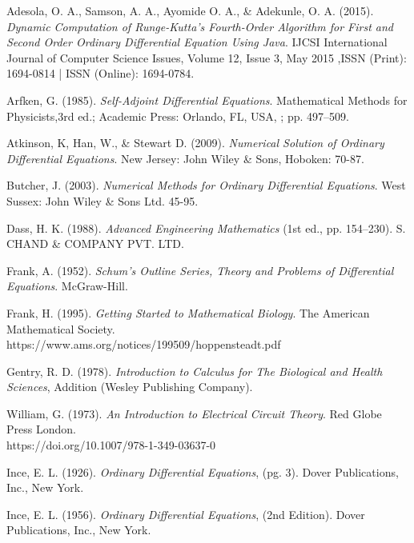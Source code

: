 \documentclass[11pt]{report}
\begin{document}
	\begin{description}
		\item Adesola, O. A., Samson, A. A., Ayomide O. A., \& Adekunle, O. A. (2015). \emph{Dynamic Computation of Runge-Kutta’s Fourth-Order Algorithm for
		First and Second Order Ordinary Differential Equation Using Java}. IJCSI International Journal of Computer Science Issues, Volume 12, Issue 3, May 2015 ,ISSN (Print): 1694-0814 | ISSN (Online): 1694-0784.
		
		\item Arfken, G. (1985). \emph{Self-Adjoint Differential Equations}. Mathematical Methods for Physicists,3rd ed.; Academic Press: Orlando, FL, USA, ; pp. 497–509.
		
		\item Atkinson, K, Han, W., \& Stewart D. (2009). \emph{Numerical Solution of Ordinary Differential Equations}. New Jersey: John Wiley \& Sons, Hoboken: 70-87.
		
		\item Butcher, J. (2003). \emph{Numerical Methods for Ordinary Differential Equations}. West Sussex:
		John Wiley \& Sons Ltd. 45-95.
		
		\item Dass, H. K. (1988). \emph{Advanced Engineering Mathematics} (1st ed., pp. 154–230). S. CHAND \& COMPANY PVT. LTD.
		
		\item Frank, A. (1952). \emph{Schum's Outline Series, Theory and Problems of Differential Equations}. McGraw-Hill.
		
		\item Frank, H. (1995). \emph{Getting Started to Mathematical Biology}. The American Mathematical Society. \\ https://www.ams.org/notices/199509/hoppensteadt.pdf
		
		\item Gentry, R. D. (1978). \emph{Introduction to Calculus for The Biological and Health Sciences}, Addition (Wesley Publishing Company).
		
		\item William, G. (1973). \emph{An Introduction to Electrical Circuit Theory}. Red Globe Press London.
		\\https://doi.org/10.1007/978-1-349-03637-0
		
		\item Ince, E. L. (1926). \emph{Ordinary Differential Equations}, (pg. 3). Dover Publications, Inc., New York.
		
		\item Ince, E. L. (1956). \emph{Ordinary Differential Equations}, (2nd Edition). Dover Publications, Inc., New York.
		

\end{description}
\end{document}
